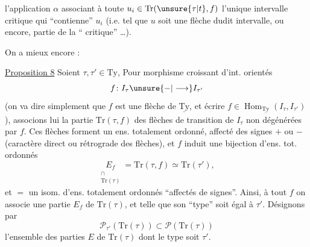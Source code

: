 l'application $\alpha$ associant à toute $u_i\in\mathrm{Tr}(\unsure{\tau|t},f)$
l'unique intervalle critique qui ``contienne'' $u_i$
(i.e. tel que $u$ soit une flèche dudit intervalle,
ou encore,  partie de la `` critique''
\ldots).

On a mieux encore :

\uline{Proposition 8} Soient $\tau,\tau'\in\mathrm{Ty}$,  Pour 
morphisme croissant d'int. orientés
\[
 f\colon I_\tau\unsure{\mathbin{-}|\longrightarrow}I_{\tau'}
\]
(on va  dire simplement que $f$ est une flèche
de $\underline{\mathrm{Ty}}$, et écrire $f\in\operatorname{Hom}_{\underline{\mathrm{Ty}}}(I_\tau,I_{\tau'})$),
associons lui la partie $\mathrm{Tr}(\tau,f)$ des
flèches de transition de $I_\tau$ non dégénérées par $f$.
Ces flèches forment un ens.  totalement ordonné,
affecté des signes $+$ ou $-$ (caractère direct ou
rétrograde des flèches), et $f$ induit une 
bijection d'ens. tot. ordonnés
\[
\underset{\substack{\cap\\\mathrm{Tr}(\tau)}}{E_f}=\mathrm{Tr}(\tau,f)\simeq\mathrm{Tr}(\tau'),
\]
et $=$ un isom. d'ens. totalement ordonnés
``affectés de signes''. Ainsi, à tout $f$ on associe
une partie $E_f$ de $\mathrm{Tr}(\tau)$, et telle que
son ``type'' soit égal à $\tau'$. Désignons par
\[
\mathscr{P}_{\tau'}(\mathrm{Tr}(\tau))\subset\mathscr{P}(\mathrm{Tr}(\tau))
\]
l'ensemble des parties $E$ de $\mathrm{Tr}(\tau)$ dont le type soit $\tau'$.
